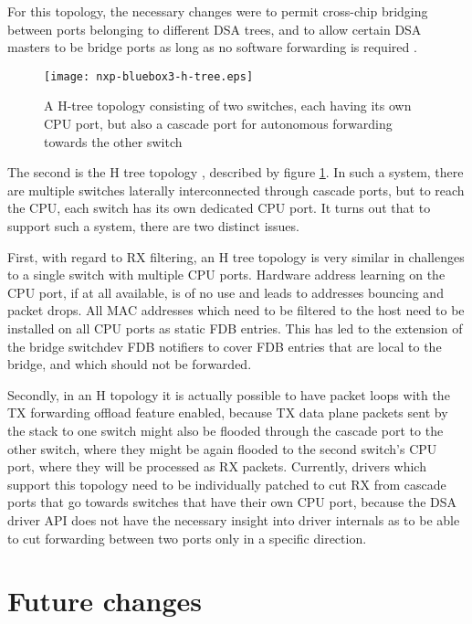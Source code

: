 \documentclass[letterpaper]{article}
\begin{document}
For this topology, the necessary changes were to permit cross-chip bridging
between ports belonging to different DSA trees, and to allow certain DSA
masters to be bridge ports as long as no software forwarding is required
\cite{dsa-disjoint-trees}.

\begin{figure}[ht]
  \centering
  \texttt{[image: nxp-bluebox3-h-tree.eps]}
  \caption{A H-tree topology consisting of two switches, each having its own CPU port, but also a cascade port for autonomous forwarding towards the other switch}
  \label{nxp-bluebox3-h-tree}
\end{figure}

The second is the H tree topology \cite{dsa-h-tree}, described by figure
\ref{nxp-bluebox3-h-tree}. In such a system, there are multiple switches
laterally interconnected through cascade ports, but to reach the CPU, each
switch has its own dedicated CPU port. It turns out that to support such a
system, there are two distinct issues.

First, with regard to RX filtering, an H tree topology is very similar in
challenges to a single switch with multiple CPU ports. Hardware address
learning on the CPU port, if at all available, is of no use and leads to
addresses bouncing and packet drops. All MAC addresses which need to be
filtered to the host need to be installed on all CPU ports as static FDB
entries. This has led to the extension of the bridge switchdev FDB notifiers to
cover FDB entries that are local to the bridge, and which should not be
forwarded.

Secondly, in an H topology it is actually possible to have packet loops with
the TX forwarding offload feature enabled, because TX data plane packets sent
by the stack to one switch might also be flooded through the cascade port to
the other switch, where they might be again flooded to the second switch's CPU
port, where they will be processed as RX packets. Currently, drivers which
support this topology need to be individually patched to cut RX from cascade
ports that go towards switches that have their own CPU port, because the DSA
driver API does not have the necessary insight into driver internals as to be
able to cut forwarding between two ports only in a specific direction.

\section{Future changes}
\end{document}
